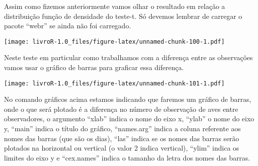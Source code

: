 \documentclass[]{book}
\newenvironment{Shaded}{\begin{snugshade}}{\end{snugshade}}
\newcommand{\DataTypeTok}[1]{\textcolor[rgb]{0.13,0.29,0.53}{#1}}
\newcommand{\DecValTok}[1]{\textcolor[rgb]{0.00,0.00,0.81}{#1}}
\newcommand{\FloatTok}[1]{\textcolor[rgb]{0.00,0.00,0.81}{#1}}
\newcommand{\KeywordTok}[1]{\textcolor[rgb]{0.13,0.29,0.53}{\textbf{#1}}}
\newcommand{\NormalTok}[1]{#1}
\newcommand{\OperatorTok}[1]{\textcolor[rgb]{0.81,0.36,0.00}{\textbf{#1}}}
\newcommand{\OtherTok}[1]{\textcolor[rgb]{0.56,0.35,0.01}{#1}}
\newcommand{\StringTok}[1]{\textcolor[rgb]{0.31,0.60,0.02}{#1}}
\begin{document}
Assim como fizemos anteriormente vamos olhar o resultado em relação a distribuição função de densidade do teste-t. Só devemos lembrar de carregar o pacote ``webr'' se ainda não foi carregado.

\begin{Shaded}
\end{Shaded}

\texttt{[image: livroR-1.0\_files/figure-latex/unnamed-chunk-100-1.pdf]}

Neste teste em particular como trabalhamos com a diferença entre as observações vamos usar o gráfico de barras para graficar essa diferença.

\begin{Shaded}
\end{Shaded}

\texttt{[image: livroR-1.0\_files/figure-latex/unnamed-chunk-101-1.pdf]}

No comando gráficos acima estamos indicando que faremos um gráfico de barras, onde o que será plotado é a diferença no número de observação de aves entre observadores, o argumento ``xlab'' indica o nome do eixo x, ``ylab'' o nome do eixo y, ``main'' indica o título do gráfico, ``names.arg'' indica a coluna referente aos nomes das barras (que são os dias), ``las'' indica se os nomes das barras serão plotados na horizontal ou vertical (o valor 2 indica vertical), ``ylim'' indica os limites do eixo y e ``cex.names'' indica o tamanho da letra dos nomes das barras.
\end{document}
